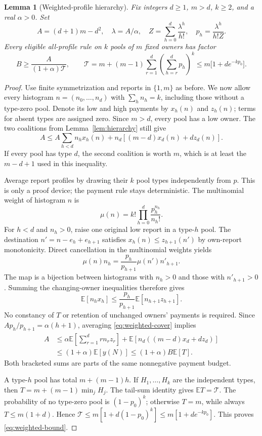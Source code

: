 \documentclass[11pt]{article}
\newtheorem{lemma}[theorem]{Lemma}
\theoremstyle{definition}\newtheorem{definition}[theorem]{Definition}
\theoremstyle{remark}\newtheorem{remark}[theorem]{Remark}
\newcommand{\E}{\mathbb E}
\begin{document}
\begin{lemma}[Weighted-profile hierarchy]\label{lem:weighted-hierarchy}
Fix integers $d\ge1$, $m>d$, $k\ge2$, and a real $\alpha>0$. Set
\[
 A=(d+1)m-d^2,\quad \lambda=A/\alpha,\quad
 Z=\sum_{h=0}^d\frac{\lambda^h}{h!},\quad
 p_h=\frac{\lambda^h}{h!Z}.
\]
Every eligible all-profile rule on $k$ pools of $m$ fixed owners has factor
\begin{equation}\label{eq:weighted-bound}
 B\ge\frac{A}{(1+\alpha)\mathcal T},\qquad
 \mathcal T=m+(m-1)\sum_{r=1}^d
             \left(\sum_{h=r}^d p_h\right)^k
 \le m\bigl[1+d e^{-kp_0}\bigr].
\end{equation}
\end{lemma}
\begin{proof}
Use finite symmetrization and reports in $\{1,m\}$ as before. We now allow
every histogram $n=(n_0,\ldots,n_d)$ with $\sum_hn_h=k$, including those
without a type-zero pool. Denote its low and high payments by $x_h(n)$ and
$z_h(n)$; terms for absent types are assigned zero. Since $m>d$, every
pool has a low owner. The two coalitions from Lemma~\ref{lem:hierarchy}
still give
\begin{equation}\label{eq:weighted-cover}
 A\le A\sum_{h<d}n_hx_h(n)
          +n_d[(m-d)x_d(n)+dz_d(n)].
\end{equation}
If every pool has type $d$, the second coalition is worth $m$, which is
at least the $m-d+1$ used in this inequality.

Average report profiles by drawing their $k$ pool types independently
from $p$. This is only a proof device; the payment rule stays deterministic.
The multinomial weight of histogram $n$ is
\[
 \mu(n)=k!\prod_{h=0}^d\frac{p_h^{n_h}}{n_h!}.
\]
For $h<d$ and $n_h>0$, raise one original low report in a type-$h$ pool.
The destination $n'=n-e_h+e_{h+1}$ satisfies
$x_h(n)\le z_{h+1}(n')$ by own-report monotonicity. Direct cancellation
in the multinomial weights yields
\begin{equation}\label{eq:transport}
 \mu(n)n_h=\frac{p_h}{p_{h+1}}\mu(n')n'_{h+1}.
\end{equation}
The map is a bijection between histograms with $n_h>0$ and those with
$n'_{h+1}>0$. Summing the changing-owner inequalities therefore gives
\[
 \E[n_hx_h]\le\frac{p_h}{p_{h+1}}\E[n_{h+1}z_{h+1}].
\]
No constancy of $T$ or retention of unchanged owners' payments is required.
Since $A p_h/p_{h+1}=\alpha(h+1)$, averaging
\eqref{eq:weighted-cover} implies
\begin{align*}
 A&\le \alpha\E\left[\sum_{r=1}^d r n_rz_r\right]
       +\E\left[n_d((m-d)x_d+dz_d)\right]\\
  &\le(1+\alpha)\E[y(N)]\le(1+\alpha)B\E[T].
\end{align*}
Both bracketed sums are parts of the same nonnegative payment budget.

A type-$h$ pool has total $m+(m-1)h$. If $H_1,\ldots,H_k$ are the
independent types, then $T=m+(m-1)\min_j H_j$. The tail-sum identity gives
$\E T=\mathcal T$. The probability of no type-zero pool is $(1-p_0)^k$;
otherwise $T=m$, while always $T\le m(1+d)$. Hence
$\mathcal T\le m[1+d(1-p_0)^k]\le m[1+d e^{-kp_0}]$.
This proves \eqref{eq:weighted-bound}.
\end{proof}
\end{document}
